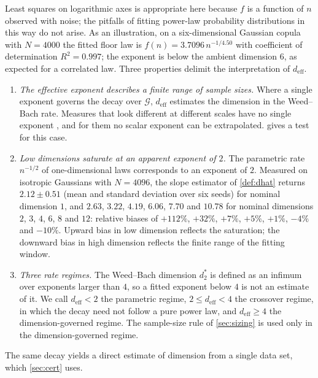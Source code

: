 \documentclass[twoside,11pt]{article}
\theoremstyle{plain}
\theoremstyle{definition}
\theoremstyle{remark}
\newcommand{\deff}{\ensuremath{d_{\mathrm{eff}}}}
\begin{document}
Least squares on logarithmic axes is appropriate here because $f$ is a
function of $n$ observed with noise; the pitfalls of fitting power-law
probability distributions in this way \citep{clauset2009} do not arise.
As an illustration, on a six-dimensional Gaussian copula with $N = 4000$
the fitted floor law is $f(n) = 3.7096 \, n^{-1/4.50}$ with coefficient of
determination $R^2 = 0.997$; the exponent is below the ambient dimension
$6$, as expected for a correlated law. Three properties delimit the
interpretation of $\deff$.

\begin{enumerate}[label=(\alph*), itemsep=4pt]
\item \emph{The effective exponent describes a finite range of sample
  sizes.} Where a single exponent governs the decay over $\mathcal{G}$,
  $\deff$ estimates the dimension in the Weed--Bach rate. Measures that
  look different at different scales have no single exponent \citep{weedbach2019}, and for them no scalar exponent can
  be extrapolated.  gives a test for this case.
\item \emph{Low dimensions saturate at an apparent exponent of $2$.} The
  parametric rate $n^{-1/2}$ of one-dimensional laws \citep{bobkov2019}
  corresponds to an exponent of $2$. Measured on isotropic Gaussians with
  $N = 4096$, the slope estimator of \cref{def:dhat} returns
  $2.12 \pm 0.51$ (mean and standard deviation over six seeds) for nominal
  dimension $1$, and $2.63$, $3.22$, $4.19$, $6.06$, $7.70$ and $10.78$ for
  nominal dimensions $2$, $3$, $4$, $6$, $8$ and $12$: relative biases of
  $+112\%$, $+32\%$, $+7\%$, $+5\%$, $+1\%$, $-4\%$ and $-10\%$. Upward bias
  in low dimension reflects the saturation; the downward bias in high
  dimension reflects the finite range of the fitting window.
\item \emph{Three rate regimes.} The Weed--Bach dimension $d_2^*$ is
  defined as an infimum over exponents larger than $4$, so a fitted
  exponent below $4$ is not an estimate of it. We call $\deff < 2$ the
  parametric regime, $2 \leq \deff < 4$ the crossover regime, in which the
  decay need not follow a pure power law, and $\deff \geq 4$ the
  dimension-governed regime. The sample-size rule of \cref{sec:sizing} is
  used only in the dimension-governed regime.
\end{enumerate}

The same decay yields a direct estimate of dimension from a single data set,
which \cref{sec:cert} uses.
\end{document}
